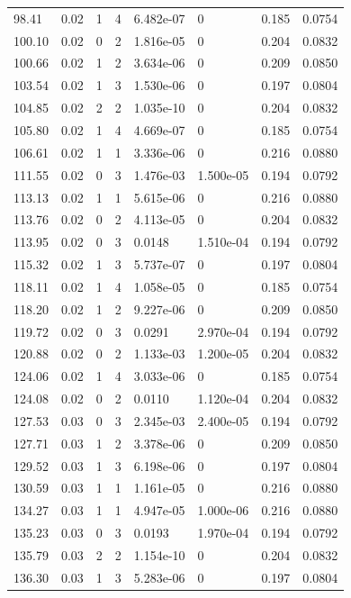 \documentclass[preview]{standalone}
\begin{document}
{{{\begin{tabular}{L{1.2cm}C{1.2cm} C{0.3cm}C{0.5cm} C{1.4cm}C{1.4cm} C{1.4cm}C{1.4cm}}
  98.41  &  0.02  & 1     &  4 &  6.482e-07  & 0  & 0.185 &  0.0754   \\ 
  100.10  &  0.02  & 0     &  2 &  1.816e-05  & 0  & 0.204 &  0.0832   \\ 
  100.66  &  0.02  & 1     &  2 &  3.634e-06  & 0  & 0.209 &  0.0850   \\ 
  103.54  &  0.02  & 1     &  3 &  1.530e-06  & 0  & 0.197 &  0.0804   \\ 
  104.85  &  0.02  & 2     &  2 &  1.035e-10  & 0  & 0.204 &  0.0832   \\ 
  105.80  &  0.02  & 1     &  4 &  4.669e-07  & 0  & 0.185 &  0.0754   \\ 
  106.61  &  0.02  & 1     &  1 &  3.336e-06  & 0  & 0.216 &  0.0880   \\ 
  111.55  &  0.02  & 0     &  3 &  1.476e-03  & 1.500e-05  & 0.194 &  0.0792   \\ 
  113.13  &  0.02  & 1     &  1 &  5.615e-06  & 0  & 0.216 &  0.0880   \\ 
  113.76  &  0.02  & 0     &  2 &  4.113e-05  & 0  & 0.204 &  0.0832   \\ 
  113.95  &  0.02  & 0     &  3 &  0.0148  & 1.510e-04  & 0.194 &  0.0792   \\ 
  115.32  &  0.02  & 1     &  3 &  5.737e-07  & 0  & 0.197 &  0.0804   \\ 
  118.11  &  0.02  & 1     &  4 &  1.058e-05  & 0  & 0.185 &  0.0754   \\ 
  118.20  &  0.02  & 1     &  2 &  9.227e-06  & 0  & 0.209 &  0.0850   \\ 
  119.72  &  0.02  & 0     &  3 &  0.0291  & 2.970e-04  & 0.194 &  0.0792   \\ 
  120.88  &  0.02  & 0     &  2 &  1.133e-03  & 1.200e-05  & 0.204 &  0.0832   \\ 
  124.06  &  0.02  & 1     &  4 &  3.033e-06  & 0  & 0.185 &  0.0754   \\ 
  124.08  &  0.02  & 0     &  2 &  0.0110  & 1.120e-04  & 0.204 &  0.0832   \\ 
  127.53  &  0.03  & 0     &  3 &  2.345e-03  & 2.400e-05  & 0.194 &  0.0792   \\ 
  127.71  &  0.03  & 1     &  2 &  3.378e-06  & 0  & 0.209 &  0.0850   \\ 
  129.52  &  0.03  & 1     &  3 &  6.198e-06  & 0  & 0.197 &  0.0804   \\ 
  130.59  &  0.03  & 1     &  1 &  1.161e-05  & 0  & 0.216 &  0.0880   \\ 
  134.27  &  0.03  & 1     &  1 &  4.947e-05  & 1.000e-06  & 0.216 &  0.0880   \\ 
  135.23  &  0.03  & 0     &  3 &  0.0193  & 1.970e-04  & 0.194 &  0.0792   \\ 
  135.79  &  0.03  & 2     &  2 &  1.154e-10  & 0  & 0.204 &  0.0832   \\ 
  136.30  &  0.03  & 1     &  3 &  5.283e-06  & 0  & 0.197 &  0.0804   \\ 
\hline 
\end{tabular} 

}}}
\end{document}

